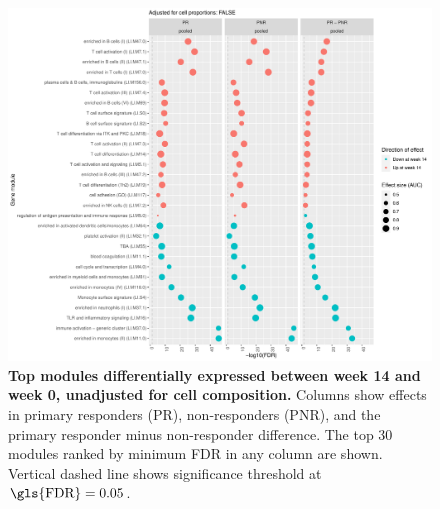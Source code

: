\begin{figure}
    \centering
    \includegraphics[width=1.0\textwidth,page=1]{mainmatter/figures/chapter_04/plot_gene_set_enrichment.tmodCERNO_panelplot_reversed_C_3R_1R,C_3N_1N,C_(3R_1R)_(3N_1N).cell_prop_correction_FALSE.pdf}
    \caption{
        \textbf{Top modules differentially expressed between week 14 and week 0, unadjusted for cell composition.}
        Columns show effects in primary responders (PR), non-responders (PNR), and the primary responder minus non-responder difference. 
        The top 30 modules ranked by minimum \gls{FDR} in any column are shown. 
        Vertical dashed line shows significance threshold at $\text{\gls{FDR}} = 0.05$.
    }
    \label{fig:multipants_dge_panelPlot_week_14_0_R_N_cellPropF}
\end{figure}

